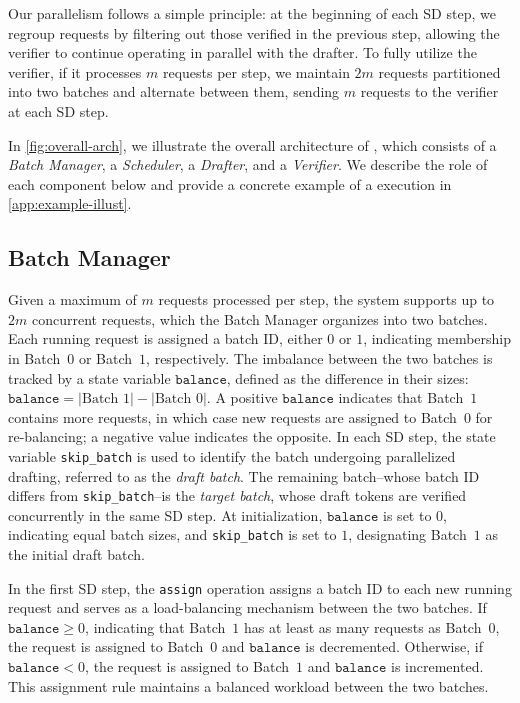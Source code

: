 

Our parallelism follows a simple principle: at the beginning of each SD step, we regroup requests by filtering out those verified in the previous step, allowing the verifier to continue operating in parallel with the drafter. To fully utilize the verifier, if it processes $m$ requests per step, we maintain $2m$ requests partitioned into two batches and alternate between them, sending $m$ requests to the verifier at each SD step.

In \cref{fig:overall-arch}, we illustrate the overall architecture of \alg{}, which consists of a \textit{Batch Manager}, a \textit{Scheduler}, a \textit{Drafter}, and a \textit{Verifier}. We describe the role of each component below and provide a concrete example of a \alg{} execution in \cref{app:example-illust}.


\subsection{Batch Manager}
Given a maximum of $m$ requests processed per step, the system supports up to $2m$ concurrent requests, which the Batch Manager organizes into two batches. Each running request is assigned a batch ID, either $0$ or $1$, indicating membership in Batch~$0$ or Batch~$1$, respectively.
The imbalance between the two batches is tracked by a state variable $\texttt{balance}$, defined as the difference in their sizes: $\texttt{balance} = |\text{Batch 1}| - |\text{Batch 0}|$. A positive $\texttt{balance}$ indicates that Batch~$1$ contains more requests, in which case new requests are assigned to Batch~$0$ for re-balancing; a negative value indicates the opposite.
In each SD step, the state variable \texttt{skip\_batch} is used to identify the batch undergoing parallelized drafting, referred to as the \textit{draft batch}. The remaining batch--whose batch ID differs from \texttt{skip\_batch}--is the \textit{target batch}, whose draft tokens are verified concurrently in the same SD step.
At initialization, $\texttt{balance}$ is set to $0$, indicating equal batch sizes, and \texttt{skip\_batch} is set to $1$, designating Batch~$1$ as the initial draft batch.

In the first SD step, the \texttt{assign} operation assigns a batch ID to each new running request and serves as a load-balancing mechanism between the two batches. If $\texttt{balance} \geq 0$, indicating that Batch~$1$ has at least as many requests as Batch~$0$, the request is assigned to Batch~$0$ and $\texttt{balance}$ is decremented. Otherwise, if $\texttt{balance} < 0$, the request is assigned to Batch~$1$ and $\texttt{balance}$ is incremented. This assignment rule maintains a balanced workload between the two batches.

